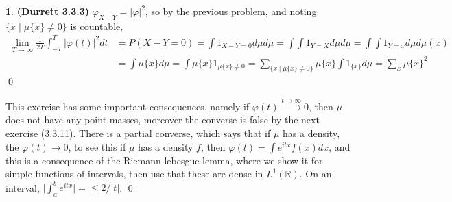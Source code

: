 \documentclass[10.5pt]{article}
\theoremstyle{definition}
\newtheorem{pb}{}
\newcommand{\set}[1]{\{#1\}}
\newcommand{\abs}[1]{\lvert#1\rvert}
\begin{document}
    \begin{pb}\textbf{(Durrett 3.3.3)}
        \(\varphi_{X-Y} = \abs{\varphi}^2\), so by the previous problem, and noting \(\set{x \mid \mu\set{x} \neq 0}\) is countable,
        \begin{align*}
            \lim_{T\to\infty}\frac{1}{2T}\int_{-T}^T \abs{\varphi(t)}^2dt &= P(X-Y = 0) = \int{1_{X - Y = 0}}d\mu d\mu = \int \int 1_{Y=X} d\mu d\mu = \int \int 1_{Y = x}d \mu d\mu(x) \\
            &= \int \mu\set{x} d\mu = \int\mu\set{x}1_{\mu\set{x}\neq 0} = \sum_{\set{x \mid \mu\set{x} \neq 0}} \mu\set{x}\int 1_{\set{x}}d\mu = \sum_x \mu\set{x}^2
        \end{align*} \qed

        This exercise has some important consequences, namely if \(\varphi(t) \overset{t\to\infty}{\longrightarrow} 0\), then \(\mu\) does not have any point masses, moreover the converse is false by the next exercise (3.3.11). There is a partial converse, which says that if \(\mu\) has a density, the \(\varphi(t) \to 0\), to see this if \(\mu\) has a density \(f\), then \(\varphi(t) = \int e^{itx}f(x)dx\), and this is a consequence of the Riemann lebesgue lemma, where we show it for simple functions of intervals, then use that these are dense in \(L^1(\mathbb{R})\). On an interval, \(\abs{\int_a^b e^{itx}} = \leq 2/\abs{t}\). \qed
    \end{pb}
\end{document}
